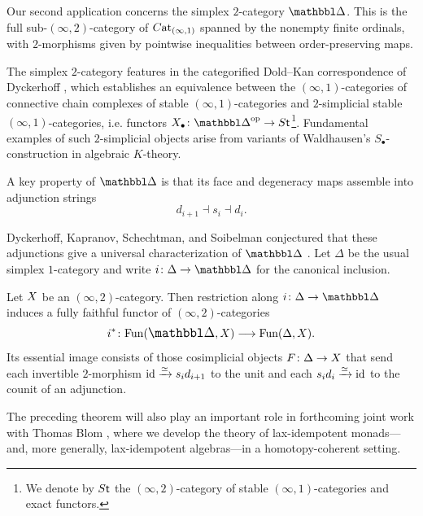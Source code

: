 \documentclass[a4paper,reqno,twoside]{amsart}
\begin{document}
Our second application concerns the simplex $2$-category $\ddelta$. This is the full sub-$(\infty,2)$-category of $\relax{C}\mathrm{at}_{(\infty,1)}$ spanned by the nonempty finite ordinals, with $2$-morphisms given by pointwise inequalities between order-preserving maps.

The simplex $2$-category features in the categorified Dold--Kan correspondence of Dyckerhoff \cite[Theorem 3.4]{Dyckerhoff2021CategorifiedDoldKan}, which establishes an equivalence between the $(\infty,1)$-categories of connective chain complexes of stable $(\infty,1)$-categories and $2$-simplicial stable $(\infty,1)$-categories, i.e. functors $\cX_\bullet \colon \ddelta^\op \to \cS\mathsf{t}$\footnote{We denote by $\relax{S}\mathsf{t}$ the $(\infty,2)$-category of stable $(\infty,1)$-categories and exact functors.}. Fundamental examples of such $2$-simplicial objects arise from variants of Waldhausen's $S_\bullet$-construction in algebraic $K$-theory.

A key property of $\ddelta$ is that its face and degeneracy maps assemble into adjunction strings
\[
	d_{i+1}\dashv s_i\dashv d_i.
\]

Dyckerhoff, Kapranov, Schechtman, and Soibelman conjectured that these adjunctions give a universal characterization of $\ddelta$ \cite[Conjecture~3.3.7]{DyckerhoffKapranovSchechtmanSoibelman2024SphericalAdjunctions}. Let $\Delta$ be the usual simplex $1$-category and write $i \colon \Delta \to \ddelta$ for the canonical inclusion.

\begin{thmint}\label{thm:intro-simplex}
	Let $\relax{X}$ be an $(\infty,2)$-category. Then restriction along $i\colon \Delta \to \ddelta$ induces a fully faithful functor of $(\infty,2)$-categories
	\[
		i^* \colon \Fun(\ddelta,\cX) \longrightarrow \Fun(\Delta,\cX).
	\]
	Its essential image consists of those cosimplicial objects $F \colon \Delta \to \relax{X}$ that send each invertible $2$-morphism $\mathrm{id} \xrightarrow{\simeq} s_i d_{i+1}$ to the unit and each $s_i d_i \xrightarrow{\simeq} \mathrm{id}$ to the counit of an adjunction.
\end{thmint}

The preceding theorem will also play an important role in forthcoming joint work with Thomas Blom \cite{AbellanBlomLaxIdempotentMonads,AbellanBlomNonCoherentLaxIdempotency}, where we develop the theory of lax-idempotent monads---and, more generally, lax-idempotent algebras---in a homotopy-coherent setting.
\end{document}
